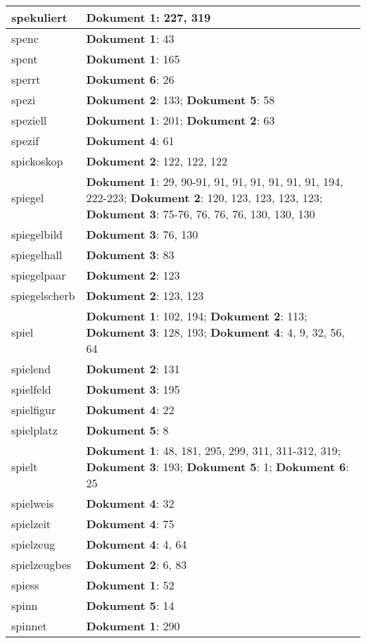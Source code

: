 \documentclass[a5paper]{article}
\begin{document}
\begin{longtable}[l]{|l|p{3in}|}
\hline
spekuliert & \textbf{Dokument 1}: 227, 319 \\
\hline
spenc & \textbf{Dokument 1}: 43 \\
\hline
spent & \textbf{Dokument 1}: 165 \\
\hline
sperrt & \textbf{Dokument 6}: 26 \\
\hline
spezi & \textbf{Dokument 2}: 133; \textbf{Dokument 5}: 58 \\
\hline
speziell & \textbf{Dokument 1}: 201; \textbf{Dokument 2}: 63 \\
\hline
spezif & \textbf{Dokument 4}: 61 \\
\hline
spickoskop & \textbf{Dokument 2}: 122, 122, 122 \\
\hline
spiegel & \textbf{Dokument 1}: 29, 90-91, 91, 91, 91, 91, 91, 91, 194, 222-223; \textbf{Dokument 2}: 120, 123, 123, 123, 123; \textbf{Dokument 3}: 75-76, 76, 76, 76, 130, 130, 130 \\
\hline
spiegelbild & \textbf{Dokument 3}: 76, 130 \\
\hline
spiegelhall & \textbf{Dokument 3}: 83 \\
\hline
spiegelpaar & \textbf{Dokument 2}: 123 \\
\hline
spiegelscherb & \textbf{Dokument 2}: 123, 123 \\
\hline
spiel & \textbf{Dokument 1}: 102, 194; \textbf{Dokument 2}: 113; \textbf{Dokument 3}: 128, 193; \textbf{Dokument 4}: 4, 9, 32, 56, 64 \\
\hline
spielend & \textbf{Dokument 2}: 131 \\
\hline
spielfeld & \textbf{Dokument 3}: 195 \\
\hline
spielfigur & \textbf{Dokument 4}: 22 \\
\hline
spielplatz & \textbf{Dokument 5}: 8 \\
\hline
spielt & \textbf{Dokument 1}: 48, 181, 295, 299, 311, 311-312, 319; \textbf{Dokument 3}: 193; \textbf{Dokument 5}: 1; \textbf{Dokument 6}: 25 \\
\hline
spielweis & \textbf{Dokument 4}: 32 \\
\hline
spielzeit & \textbf{Dokument 4}: 75 \\
\hline
spielzeug & \textbf{Dokument 4}: 4, 64 \\
\hline
spielzeugbes & \textbf{Dokument 2}: 6, 83 \\
\hline
spiess & \textbf{Dokument 1}: 52 \\
\hline
spinn & \textbf{Dokument 5}: 14 \\
\hline
spinnet & \textbf{Dokument 1}: 290 \\

\end{longtable}
\end{document}
